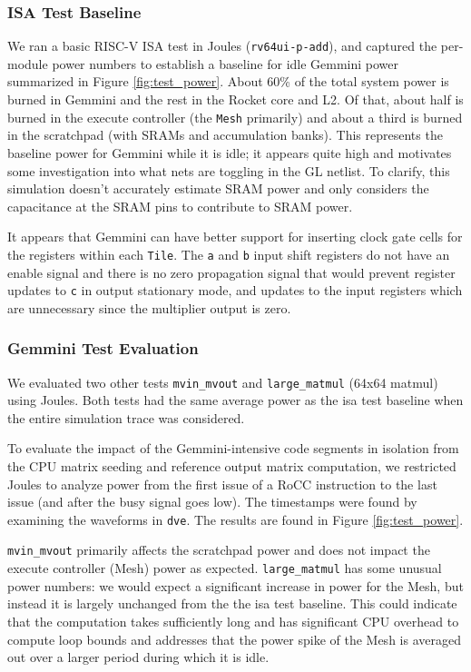 \documentclass[sigconf]{acmart}
\begin{document}
\subsubsection{ISA Test Baseline}
We ran a basic RISC-V ISA test in Joules (\texttt{rv64ui-p-add}), and captured the per-module power numbers to establish a baseline for idle Gemmini power summarized in Figure \ref{fig:test_power}.
About 60\% of the total system power is burned in Gemmini and the rest in the Rocket core and L2.
Of that, about half is burned in the execute controller (the \texttt{Mesh} primarily) and about a third is burned in the scratchpad (with SRAMs and accumulation banks).
This represents the baseline power for Gemmini while it is idle; it appears quite high and motivates some investigation into what nets are toggling in the GL netlist.
To clarify, this simulation doesn't accurately estimate SRAM power and only considers the capacitance at the SRAM pins to contribute to SRAM power.

It appears that Gemmini can have better support for inserting clock gate cells for the registers within each \texttt{Tile}.
The \texttt{a} and \texttt{b} input shift registers do not have an enable signal and there is no zero propagation signal that would prevent register updates to \texttt{c} in output stationary mode, and updates to the input registers which are unnecessary since the multiplier output is zero.

\subsubsection{Gemmini Test Evaluation}
We evaluated two other tests \texttt{mvin\_mvout} and \texttt{large\_matmul} (64x64 matmul) using Joules.
Both tests had the same average power as the isa test baseline when the entire simulation trace was considered.

To evaluate the impact of the Gemmini-intensive code segments in isolation from the CPU matrix seeding and reference output matrix computation, we restricted Joules to analyze power from the first issue of a RoCC instruction to the last issue (and after the busy signal goes low).
The timestamps were found by examining the waveforms in \texttt{dve}.
The results are found in Figure \ref{fig:test_power}.

\texttt{mvin\_mvout} primarily affects the scratchpad power and does not impact the execute controller (Mesh) power as expected.
\texttt{large\_matmul} has some unusual power numbers: we would expect a significant increase in power for the Mesh, but instead it is largely unchanged from the the isa test baseline.
This could indicate that the computation takes sufficiently long and has significant CPU overhead to compute loop bounds and addresses that the power spike of the Mesh is averaged out over a larger period during which it is idle.
\end{document}
